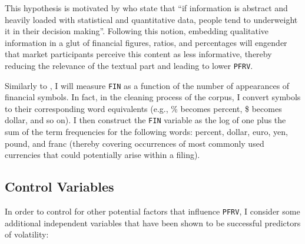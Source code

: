 This hypothesis is motivated by \textcite[1-2]{Amel-Zadeh_Faasse_2016} who state that \enquote{if information is abstract and heavily loaded with statistical and quantitative data, people tend to underweight it in their decision making}. Following this notion, embedding qualitative information in a glut of financial figures, ratios, and percentages will engender that market participants perceive this content as less informative, thereby reducing the relevance of the textual part and leading to lower \texttt{PFRV}.

Similarly to \textcite{HuangZangZheng14}, I will measure \texttt{FIN} as a function of the number of appearances of financial symbols. In fact, in the cleaning process of the corpus, I convert symbols to their corresponding word equivalents (e.g., \textsf{\%} becomes \textsf{percent}, \textsf{\$} becomes \textsf{dollar}, and so on). I then construct the \texttt{FIN} variable as the log of one plus the sum of the term frequencies for the following words: \textsf{percent}, \textsf{dollar}, \textsf{euro}, \textsf{yen}, \textsf{pound}, and \textsf{franc} (thereby covering occurrences of most commonly used currencies that could potentially arise within a filing). 


\subsection{Control Variables}
\label{ssec: volamodel_controls}
In order to control for other potential factors that influence \texttt{PFRV}, I consider some additional independent variables that have been shown to be successful predictors of volatility: 

